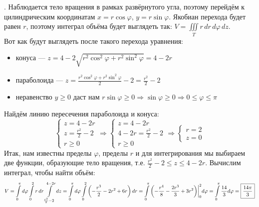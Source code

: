 \documentclass[a3paper,14pt]{extarticle}
\newcommand*\squared[1]{\tikz[baseline=(char.base)]{
            \node[shape=rectangle,draw,inner sep=4pt] (char) {#1};}}
\newcommand{\at}{\biggr\rvert}
\begin{document}
\pagebreak{}. Наблюдается тело вращения в рамках развёрнутого угла, поэтому перейдём к цилиндрическим координатам $x=r\cos{\varphi}$, $y=r\sin{\varphi}$. Якобиан перехода будет равен $r$, поэтому интеграл объёма будет выглядеть так: $V = \iiint\limits_T r\,dr\,d\varphi\,dz$. \\
Вот как будут выглядеть после такого перехода уравнения:
\begin{itemize}
    \item конуса --- $z = 4 - 2\sqrt{r^2\cos^2{\varphi}+r^2\sin^2{\varphi}} = 4 - 2r$
    \item параболоида --- $z = \frac{r^2\cos^2{\varphi}+r^2\sin^2{\varphi}}{2}-2=\frac{r^2}{2}-2$
    \item неравенство $y \ge 0$ даст нам $r\sin{\varphi} \ge 0 \Rightarrow \sin{\varphi} \ge 0 \Rightarrow 0 \le \varphi \le \pi$
\end{itemize}
Найдём линию пересечения параболоида и конуса:
$$\begin{cases}
    z = 4 - 2r \\
    z = \frac{r^2}{2}-2 \\
    r \ge 0
\end{cases} \Rightarrow \begin{cases}
    z = 4 - 2r \\
    4 - 2r = \frac{r^2}{2}-2 \\
    r \ge 0
\end{cases} \Rightarrow \begin{cases}
    r = 2 \\
    z = 0
\end{cases}$$
Итак, нам известны пределы $\varphi$, пределы $r$ и для интегрирования мы выбираем две функции, образующие тело вращения, т.е. $\frac{r^2}{2}-2\le z \le 4-2r$. Вычислим интеграл, чтобы найти объём:
$$V = \int\limits_0^\pi d\varphi\int\limits_0^2 r\,dr\int\limits_{\frac{r^2}{2}-2}^{4-2r}dz = \int\limits_0^\pi d\varphi\int\limits_0^2 \left(-\frac{r^3}{2}-2r^2+6r\right)dr = \int\limits_0^\pi \left(-\frac{r^4}{8}-\frac{2r^3}{3}+3r^2\right)\at_0^2d\varphi = \int\limits_0^\pi \frac{14}{3}d\varphi = \squared{$\dfrac{14\pi}{3}$}$$
\end{document}

